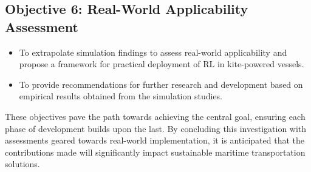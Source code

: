 \subsection*{Objective 6: Real-World Applicability Assessment}
\begin{itemize}
    \item To extrapolate simulation findings to assess real-world applicability and propose a framework for practical deployment of RL in kite-powered vessels.
    \item To provide recommendations for further research and development based on empirical results obtained from the simulation studies.
\end{itemize}

These objectives pave the path towards achieving the central goal, ensuring each phase of development builds upon the last. By concluding this investigation with assessments geared towards real-world implementation, it is anticipated that the contributions made will significantly impact sustainable maritime transportation solutions.



